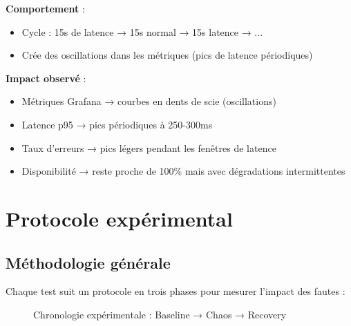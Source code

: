 \textbf{Comportement} :
\begin{itemize}
    \item Cycle : 15s de latence → 15s normal → 15s latence → ...
    \item Crée des oscillations dans les métriques (pics de latence périodiques)
\end{itemize}

\textbf{Impact observé} :
\begin{itemize}
    \item Métriques Grafana → courbes en dents de scie (oscillations)
    \item Latence p95 → pics périodiques à 250-300ms
    \item Taux d'erreurs → pics légers pendant les fenêtres de latence
    \item Disponibilité → reste proche de 100\% mais avec dégradations intermittentes
\end{itemize}

\section{Protocole expérimental}

\subsection{Méthodologie générale}

Chaque test suit un protocole en trois phases pour mesurer l'impact des fautes :

\begin{figure}[H]
\centering
{}
\caption{Chronologie expérimentale : Baseline → Chaos → Recovery}
\end{figure}

